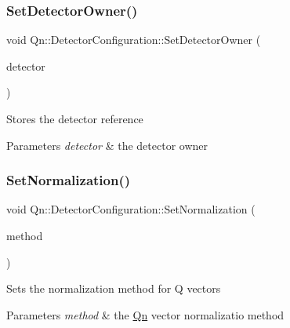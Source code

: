 \subsubsection{\texorpdfstring{Set\+Detector\+Owner()}{SetDetectorOwner()}}
{\footnotesize\ttfamily void Qn\+::\+Detector\+Configuration\+::\+Set\+Detector\+Owner (\begin{DoxyParamCaption}\item[{\mbox{\hyperlink{classQn_1_1CorrectionDetector}{Correction\+Detector}} $\ast$}]{detector }\end{DoxyParamCaption})\hspace{0.3cm}{\ttfamily [inline]}}

Stores the detector reference 
\begin{DoxyParams}{Parameters}
{\em detector} & the detector owner \\
\hline
\end{DoxyParams}
\mbox{\label{classQn_1_1DetectorConfiguration_a018d9391fa2fbe6fe3c3d1dd5c3389d7}} 
\subsubsection{\texorpdfstring{Set\+Normalization()}{SetNormalization()}}
{\footnotesize\ttfamily void Qn\+::\+Detector\+Configuration\+::\+Set\+Normalization (\begin{DoxyParamCaption}\item[{\mbox{\hyperlink{classQn_1_1CorrectionQnVector_a2998fe4babb716c57848c8c73b24a398}{Correction\+Qn\+Vector\+::\+Normalization}}}]{method }\end{DoxyParamCaption})\hspace{0.3cm}{\ttfamily [inline]}}

Sets the normalization method for Q vectors 
\begin{DoxyParams}{Parameters}
{\em method} & the \mbox{\hyperlink{namespaceQn}{Qn}} vector normalizatio method \\
\hline
\end{DoxyParams}
\mbox{\label{classQn_1_1DetectorConfiguration_abeabec819fe0cab801d7afbe185abe40}} 
